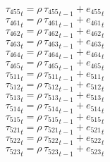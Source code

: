 \begin{dmath}
{{\tau_{455}}}_{t}={{\rho}}\, {{\tau_{455}}}_{t-1}+{{e_{455}}}_{t}
\end{dmath}
\begin{dmath}
{{\tau_{461}}}_{t}={{\rho}}\, {{\tau_{461}}}_{t-1}+{{e_{461}}}_{t}
\end{dmath}
\begin{dmath}
{{\tau_{462}}}_{t}={{\rho}}\, {{\tau_{462}}}_{t-1}+{{e_{462}}}_{t}
\end{dmath}
\begin{dmath}
{{\tau_{463}}}_{t}={{\rho}}\, {{\tau_{463}}}_{t-1}+{{e_{463}}}_{t}
\end{dmath}
\begin{dmath}
{{\tau_{464}}}_{t}={{\rho}}\, {{\tau_{464}}}_{t-1}+{{e_{464}}}_{t}
\end{dmath}
\begin{dmath}
{{\tau_{465}}}_{t}={{\rho}}\, {{\tau_{465}}}_{t-1}+{{e_{465}}}_{t}
\end{dmath}
\begin{dmath}
{{\tau_{511}}}_{t}={{\rho}}\, {{\tau_{511}}}_{t-1}+{{e_{511}}}_{t}
\end{dmath}
\begin{dmath}
{{\tau_{512}}}_{t}={{\rho}}\, {{\tau_{512}}}_{t-1}+{{e_{512}}}_{t}
\end{dmath}
\begin{dmath}
{{\tau_{513}}}_{t}={{\rho}}\, {{\tau_{513}}}_{t-1}+{{e_{513}}}_{t}
\end{dmath}
\begin{dmath}
{{\tau_{514}}}_{t}={{\rho}}\, {{\tau_{514}}}_{t-1}+{{e_{514}}}_{t}
\end{dmath}
\begin{dmath}
{{\tau_{515}}}_{t}={{\rho}}\, {{\tau_{515}}}_{t-1}+{{e_{515}}}_{t}
\end{dmath}
\begin{dmath}
{{\tau_{521}}}_{t}={{\rho}}\, {{\tau_{521}}}_{t-1}+{{e_{521}}}_{t}
\end{dmath}
\begin{dmath}
{{\tau_{522}}}_{t}={{\rho}}\, {{\tau_{522}}}_{t-1}+{{e_{522}}}_{t}
\end{dmath}
\begin{dmath}
{{\tau_{523}}}_{t}={{\rho}}\, {{\tau_{523}}}_{t-1}+{{e_{523}}}_{t}
\end{dmath}
